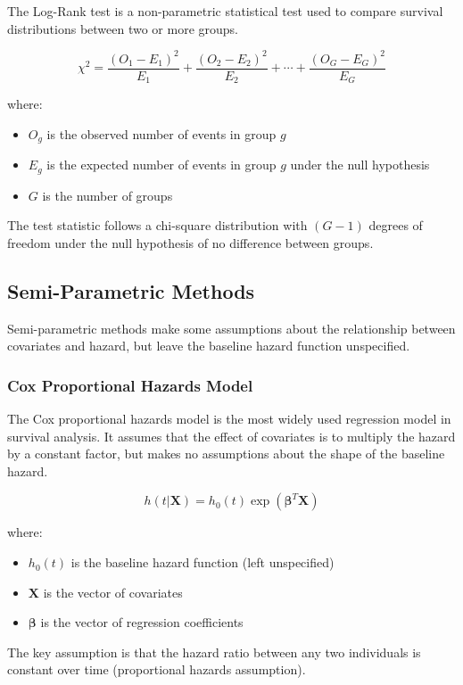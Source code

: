 The Log-Rank test is a non-parametric statistical test used to compare survival distributions between two or more groups.

\begin{equationbox}[title=Log-Rank Test Statistic]
\begin{equation}
\chi^2 = \frac{(O_1 - E_1)^2}{E_1} + \frac{(O_2 - E_2)^2}{E_2} + \cdots + \frac{(O_G - E_G)^2}{E_G}
\end{equation}

where:
\begin{itemize}
    \item $O_g$ is the observed number of events in group $g$
    \item $E_g$ is the expected number of events in group $g$ under the null hypothesis
    \item $G$ is the number of groups
\end{itemize}
The test statistic follows a chi-square distribution with $(G-1)$ degrees of freedom under the null hypothesis of no difference between groups.
\end{equationbox}

\subsection{Semi-Parametric Methods}

Semi-parametric methods make some assumptions about the relationship between covariates and hazard, but leave the baseline hazard function unspecified.

\subsubsection{Cox Proportional Hazards Model}

The Cox proportional hazards model is the most widely used regression model in survival analysis. It assumes that the effect of covariates is to multiply the hazard by a constant factor, but makes no assumptions about the shape of the baseline hazard.

\begin{equationbox}[title=Cox Proportional Hazards Model]
\begin{equation}
h(t|\mathbf{X}) = h_0(t) \exp(\boldsymbol{\beta}^T \mathbf{X})
\end{equation}

where:
\begin{itemize}
    \item $h_0(t)$ is the baseline hazard function (left unspecified)
    \item $\mathbf{X}$ is the vector of covariates
    \item $\boldsymbol{\beta}$ is the vector of regression coefficients
\end{itemize}

The key assumption is that the hazard ratio between any two individuals is constant over time (proportional hazards assumption).
\end{equationbox}

